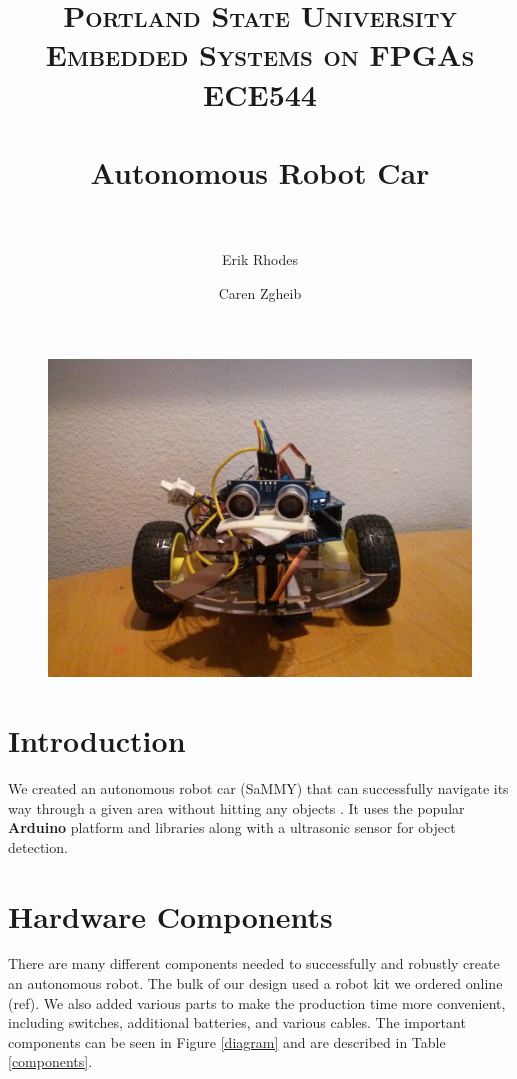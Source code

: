 \documentclass[11pt]{article}
\title{	
\normalfont \normalsize 
\textsc{\LARGE Portland State University}\\[1.5cm] %
\textsc{\Large Embedded Systems on FPGAs}\\[0.5cm] %
\textsc{\large ECE544}\\[0.5cm] %
\horrule{1.2pt} \\[0.4cm] %
\huge Autonomous Robot Car \\ %
\horrule{1.2pt} \\[0.5cm] %
}
\begin{document}
\author{Erik Rhodes \and Caren Zgheib} %
\maketitle %
\thispagestyle{empty}


\begin{figure}[h]\centering
\includegraphics[height=0.65\textwidth]{images/bot_front.jpg}
		\label{bot_front}
	\end{figure}
	
\tableofcontents
\newpage

\section{Introduction} 
We created an autonomous robot car (SaMMY) that can successfully navigate its way through a given area without hitting any objects . It uses the popular \textbf{Arduino} platform and libraries along with a ultrasonic sensor for object detection. 


\section{Hardware Components}
There are many different components needed to successfully and robustly create an autonomous robot.  The bulk of our design used a robot kit we ordered online (ref).  We also added various parts to make the production time more convenient, including switches, additional batteries, and various cables.  The important components can be seen in Figure \ref{diagram} and are described in Table \ref{components}.
\end{document}
